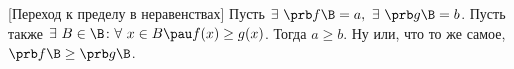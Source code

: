 [Переход к пределу в неравенствах]\label{Basanestr}
 	Пусть $\exists\ \prb f\B=a,\ \exists\ \prb g\B=b$. Пусть также $\exists\  B\in\B\colon \forall\  x\in B\pau f(x)\geq g(x)$.
 	Тогда $a\geq b$. Ну или, что то же самое, $\prb f\B\geq \prb g\B$.
 